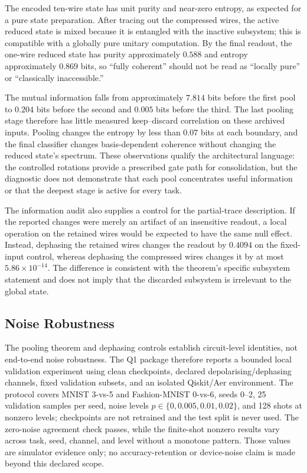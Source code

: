 \documentclass[conference]{IEEEtran}
\begin{document}
The encoded ten-wire state has unit purity and near-zero entropy, as expected
for a pure state preparation. After tracing out the compressed wires, the
active reduced state is mixed because it is entangled with the inactive
subsystem; this is compatible with a globally pure unitary computation. By the
final readout, the one-wire reduced state has purity approximately $0.588$ and
entropy approximately $0.869$ bits, so ``fully coherent'' should not be read as
``locally pure'' or ``classically inaccessible.''

The mutual information falls from approximately $7.814$ bits before the first
pool to $0.204$ bits before the second and $0.005$ bits before the third. The
last pooling stage therefore has little measured keep--discard correlation on
these archived inputs. Pooling changes the entropy by less than $0.07$ bits at
each boundary, and the final classifier changes basis-dependent coherence
without changing the reduced state's spectrum. These observations qualify the
architectural language: the controlled rotations provide a prescribed gate
path for consolidation, but the diagnostic does not demonstrate that each
pool concentrates useful information or that the deepest stage is active for
every task.

The information audit also supplies a control for the partial-trace description.
If the reported changes were merely an artifact of an insensitive readout, a
local operation on the retained wires would be expected to have the same null
effect. Instead, dephasing the retained wires changes the readout by $0.4094$
on the fixed-input control, whereas dephasing the compressed wires changes it by
at most $5.86\times10^{-14}$. The difference is consistent with the theorem's
specific subsystem statement and does not imply that the discarded subsystem is
irrelevant to the global state.

\subsection{Noise Robustness}
The pooling theorem and dephasing controls establish circuit-level identities, not end-to-end noise robustness. The Q1 package therefore reports a bounded local validation experiment using clean checkpoints, declared depolarising/dephasing channels, fixed validation subsets, and an isolated Qiskit/Aer environment. The protocol covers MNIST 3-vs-5 and Fashion-MNIST 0-vs-6, seeds 0--2, 25 validation samples per seed, noise levels $p\in\{0,0.005,0.01,0.02\}$, and 128 shots at nonzero levels; checkpoints are not retrained and the test split is never used. The zero-noise agreement check passes, while the finite-shot nonzero results vary across task, seed, channel, and level without a monotone pattern. Those values are simulator evidence only; no accuracy-retention or device-noise claim is made beyond this declared scope.
\end{document}
